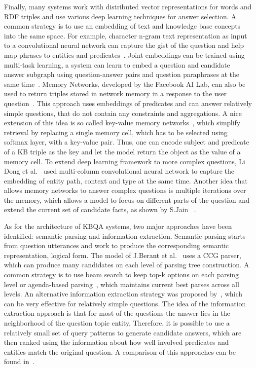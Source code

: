 Finally, many systems work with distributed vector representations for words and RDF triples and use various deep learning techniques for answer selection.
A common strategy is to use an embedding of text and knowledge base concepts into the same space.
For example, character n-gram text representation as input to a convolutional neural network can capture the gist of the question and help map phrases to entities and predicates~\cite{yih2014semantic}.
Joint embeddings can be trained using multi-task learning, \eg a system can learn to embed a question and candidate answer subgraph using question-answer pairs and question paraphrases at the same time~\cite{BordesCW14:emnlp}.
Memory Networks, developed by the Facebook AI Lab, can also be used to return triples stored in network memory in a response to the user question~\cite{bordes2015large}.
This approach uses embeddings of predicates and can answer relatively simple questions, that do not contain any constraints and aggregations.
A nice extension of this idea is so called key-value memory networks~\cite{miller2016key}, which simplify retrieval by replacing a single memory cell, which has to be selected using softmax layer, with a key-value pair.
Thus, one can encode subject and predicate of a KB triple as the key and let the model return the object as the value of a memory cell.
To extend deep learning framework to more complex questions, Li Dong et al.~\cite{dong2015question} used multi-column convolutional neural network to capture the embedding of entity path, context and type at the same time.
Another idea that allows memory networks to answer complex questions is multiple iterations over the memory, which allows a model to focus on different parts of the question and extend the current set of candidate facts, as shown by S.Jain ~\cite{jain2016question}.

As for the architecture of KBQA systems, two major approaches have been identified: semantic parsing and information extraction.
Semantic parsing starts from question utterances and work to produce the corresponding semantic representation, \eg logical form.
The model of J.Berant et al.~\cite{BerantCFL13:sempre} uses a CCG parser, which can produce many candidates on each level of parsing tree construction.
A common strategy is to use beam search to keep top-k options on each parsing level or agenda-based parsing~\cite{berant2015imitation}, which maintains current best parses across all levels.
An alternative information extraction strategy was proposed by~\cite{YaoD14}, which can be very effective for relatively simple questions.
The idea of the information extraction approach is that for most of the questions the answer lies in the neighborhood of the question topic entity.
Therefore, it is possible to use a relatively small set of query patterns to generate candidate answers, which are then ranked using the information about how well involved predicates and entities match the original question.
A comparison of this approaches can be found in~\cite{yao2014freebase}.

